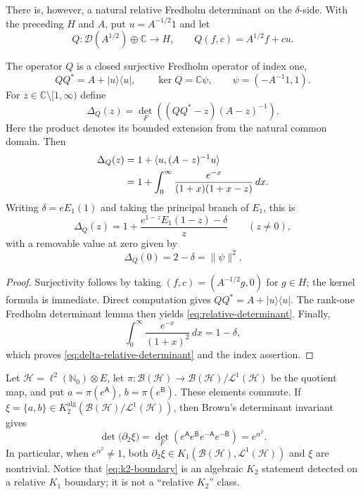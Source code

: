 There is, however, a natural relative Fredholm determinant on the
$\delta$-side.  With the preceding $H$ and $A$, put $u=A^{-1/2}1$ and let
\[
 Q:\mathcal D(A^{1/2})\oplus\mathbb C\longrightarrow H,
 \qquad Q(f,c)=A^{1/2}f+cu.
\]

\begin{proposition}
The operator $Q$ is a closed surjective Fredholm operator of index one,
\[
 QQ^*=A+|u\rangle\langle u|,
 \qquad
 \ker Q=\mathbb C\psi,
 \qquad
 \psi=(-A^{-1}1,1).
\]
For $z\in\mathbb C\setminus[1,\infty)$ define
\[
 \Delta_Q(z)=
 \det_F\!\left((QQ^*-z)(A-z)^{-1}\right).
\]
Here the product denotes its bounded extension from the natural common
domain.
Then
\begin{align}
 \Delta_Q(z)
 &=1+\langle u,(A-z)^{-1}u\rangle \notag\\
 &=1+\int_0^\infty
       \frac{e^{-x}}{(1+x)(1+x-z)}\,dx.\label{eq:relative-determinant}
\end{align}
Writing $\delta=eE_1(1)$ and taking the principal branch of $E_1$, this is
\[
 \Delta_Q(z)=1+
 \frac{e^{1-z}E_1(1-z)-\delta}{z}
 \qquad(z\ne0),
\]
with a removable value at zero given by
\begin{equation}\label{eq:delta-relative-determinant}
 \Delta_Q(0)=2-\delta=\|\psi\|^2.
\end{equation}
\end{proposition}

\begin{proof}
Surjectivity follows by taking $(f,c)=(A^{-1/2}g,0)$ for $g\in H$;
the kernel formula is immediate.  Direct computation gives
$QQ^*=A+|u\rangle\langle u|$.  The rank-one Fredholm determinant lemma
then yields \eqref{eq:relative-determinant}.  Finally,
\[
 \int_0^\infty\frac{e^{-x}}{(1+x)^2}\,dx=1-\delta,
\]
which proves \eqref{eq:delta-relative-determinant} and the index assertion.
\end{proof}

Let $\mathscr H=\ell^2(\mathbb N_0)\otimes E$, let
$\pi:\mathcal B(\mathscr H)\to
\mathcal B(\mathscr H)/\mathcal L^1(\mathscr H)$ be the quotient map, and
put $a=\pi(e^{\mathsf A})$, $b=\pi(e^{\mathsf B})$.  These elements commute.
If $\xi=\{a,b\}\in
K_2^{\mathrm{alg}}(\mathcal B(\mathscr H)/\mathcal L^1(\mathscr H))$, then
Brown's determinant invariant gives~\cite{Migler2017,Kaad2011}
\begin{equation}\label{eq:k2-boundary}
 \det\bigl(\partial_2\xi\bigr)
 =\det_F(e^{\mathsf A}e^{\mathsf B}
          e^{-\mathsf A}e^{-\mathsf B})
 =e^{\alpha^2}.
\end{equation}
In particular, when $e^{\alpha^2}\ne1$, both
$\partial_2\xi\in
K_1(\mathcal B(\mathscr H),\mathcal L^1(\mathscr H))$ and $\xi$ are
nontrivial.  Notice that \eqref{eq:k2-boundary} is an algebraic
$K_2$ statement detected on a relative $K_1$ boundary; it is not a
``relative $K_2$'' class.

